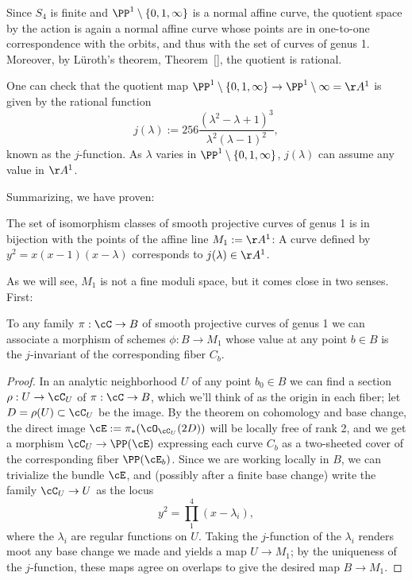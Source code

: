 Since $S_4$ is finite and $\PP^1 \setminus \{0,1,\infty\}$ is a normal affine curve, the quotient space by the action is again a normal affine curve whose points are in one-to-one
correspondence with the orbits, and thus with the set of curves of genus 1. 
 Moreover, by L\"uroth's theorem, Theorem~\ref{}, the quotient is rational.
 
One can check that the quotient map $\PP^1 \setminus \{0,1,\infty\} \to \PP^1\setminus \infty = \AA^1$
is given by the rational function
$$
j(\lambda) := 256\frac{(\lambda^2-\lambda + 1)^3}{\lambda^2(\lambda-1)^2},
$$
known as the $j$-function. As $\lambda$ varies in $\PP^1 \setminus \{0,1,\infty\}$, $j(\lambda)$ can assume any value in $\AA^1$.

Summarizing, we have proven:

\begin{theorem}
The set of isomorphism classes of smooth projective curves of genus 1 is in bijection with the points of the affine line $M_1: = \AA^1$: A curve defined by $y^2 = x(x-1)(x-\lambda)$
corresponds to $j(\lambda)\in \AA^1$.
\end{theorem}

 As we will see,
$M_1$ is not a fine moduli space, but it comes close in two senses. First:

\begin{proposition}
To any family $\pi : \cC \to B$  of smooth projective curves of genus 1 we can associate a morphism of schemes $\phi : B \to M_1$ whose value at any point $b \in B$ is the $j$-invariant of the corresponding fiber $C_b$.
\end{proposition} 

\begin{proof}
In an analytic neighborhood $U$ of any point $b_0 \in B$ we can find a section $\rho : U \to \cC_U$ of $\pi : \cC \to B$, which we'll think of as the origin in each fiber; let $D = \rho(U) \subset \cC_U$ be the image. By the theorem on cohomology and base change, the direct image $\cE := \pi_*(\cO_{\cC_U}(2D))$ will be locally free of rank 2, and we get a morphism $\cC_U \to \PP(\cE)$ expressing each curve $C_b$ as a two-sheeted cover of the corresponding fiber $\PP(\cE_b)$. Since we are working locally in $B$, we can trivialize the bundle $\cE$, and (possibly after a finite base change) write the family $\cC_U \to U$ as the locus
$$
y^2 = \prod_1^4 (x - \lambda_i),
$$
where the $\lambda_i$ are regular functions on $U$. Taking the $j$-function of the $\lambda_i$ renders moot any base change we made  and yields a map $U \to M_1$; by the uniqueness of the $j$-function, these maps agree on overlaps to give  the desired map $B \to M_1$.
\end{proof}

